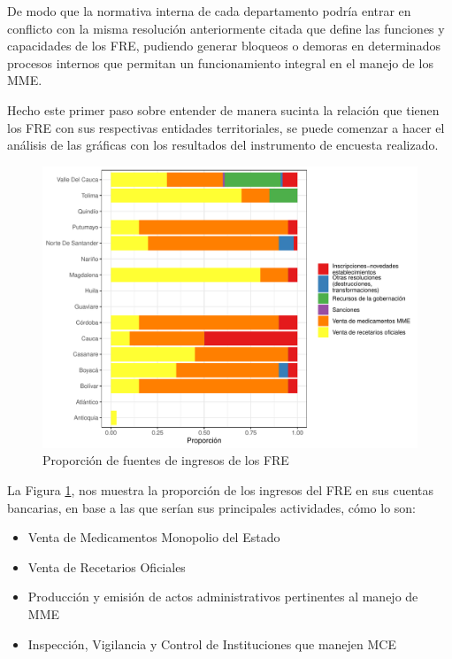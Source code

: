 \documentclass[
]{book}
\begin{document}
De modo que la normativa interna de cada departamento podría entrar en conflicto con la misma resolución anteriormente citada que define las funciones y capacidades de los FRE, pudiendo generar bloqueos o demoras en determinados procesos internos que permitan un funcionamiento integral en el manejo de los MME.

Hecho este primer paso sobre entender de manera sucinta la relación que tienen los FRE con sus respectivas entidades territoriales, se puede comenzar a hacer el análisis de las gráficas con los resultados del instrumento de encuesta realizado.

\begin{figure}[t]

{\centering \includegraphics[width=0.85\linewidth]{InformeFinal_files/figure-latex/IngresosFRE1-1} 

}

\caption{Proporción de fuentes de ingresos de los FRE}\label{fig:IngresosFRE1}
\end{figure}

La Figura \ref{fig:IngresosFRE1}, nos muestra la proporción de los ingresos del FRE en sus cuentas bancarias, en base a las que serían sus principales actividades, cómo lo son:

\begin{itemize}
\item
  Venta de Medicamentos Monopolio del Estado
\item
  Venta de Recetarios Oficiales
\item
  Producción y emisión de actos administrativos pertinentes al manejo de MME
\item
  Inspección, Vigilancia y Control de Instituciones que manejen MCE
\end{itemize}
\end{document}
